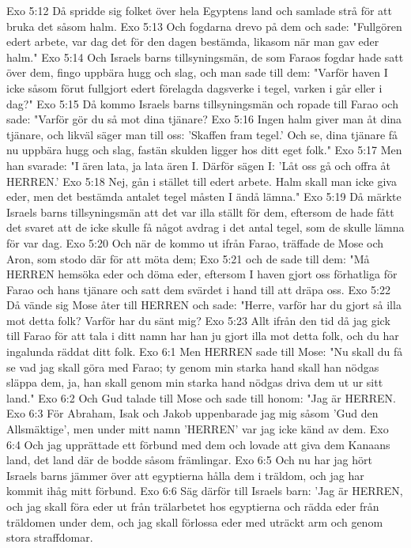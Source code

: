 Exo 5:12  Då spridde sig folket över hela Egyptens land och samlade strå för att bruka det såsom halm.
Exo 5:13  Och fogdarna drevo på dem och sade: "Fullgören edert arbete, var dag det för den dagen bestämda, likasom när man gav eder halm."
Exo 5:14  Och Israels barns tillsyningsmän, de som Faraos fogdar hade satt över dem, fingo uppbära hugg och slag, och man sade till dem: "Varför haven I icke såsom förut fullgjort edert förelagda dagsverke i tegel, varken i går eller i dag?"
Exo 5:15  Då kommo Israels barns tillsyningsmän och ropade till Farao och sade: "Varför gör du så mot dina tjänare?
Exo 5:16  Ingen halm giver man åt dina tjänare, och likväl säger man till oss: 'Skaffen fram tegel.' Och se, dina tjänare få nu uppbära hugg och slag, fastän skulden ligger hos ditt eget folk."
Exo 5:17  Men han svarade: "I ären lata, ja lata ären I. Därför sägen I: 'Låt oss gå och offra åt HERREN.'
Exo 5:18  Nej, gån i stället till edert arbete. Halm skall man icke giva eder, men det bestämda antalet tegel måsten I ändå lämna."
Exo 5:19  Då märkte Israels barns tillsyningsmän att det var illa ställt för dem, eftersom de hade fått det svaret att de icke skulle få något avdrag i det antal tegel, som de skulle lämna för var dag.
Exo 5:20  Och när de kommo ut ifrån Farao, träffade de Mose och Aron, som stodo där för att möta dem;
Exo 5:21  och de sade till dem: "Må HERREN hemsöka eder och döma eder, eftersom I haven gjort oss förhatliga för Farao och hans tjänare och satt dem svärdet i hand till att dräpa oss.
Exo 5:22  Då vände sig Mose åter till HERREN och sade: "Herre, varför har du gjort så illa mot detta folk? Varför har du sänt mig?
Exo 5:23  Allt ifrån den tid då jag gick till Farao för att tala i ditt namn har han ju gjort illa mot detta folk, och du har ingalunda räddat ditt folk.
Exo 6:1  Men HERREN sade till Mose: "Nu skall du få se vad jag skall göra med Farao; ty genom min starka hand skall han nödgas släppa dem, ja, han skall genom min starka hand nödgas driva dem ut ur sitt land."
Exo 6:2  Och Gud talade till Mose och sade till honom: "Jag är HERREN.
Exo 6:3  För Abraham, Isak och Jakob uppenbarade jag mig såsom 'Gud den Allsmäktige', men under mitt namn 'HERREN' var jag icke känd av dem.
Exo 6:4  Och jag upprättade ett förbund med dem och lovade att giva dem Kanaans land, det land där de bodde såsom främlingar.
Exo 6:5  Och nu har jag hört Israels barns jämmer över att egyptierna hålla dem i träldom, och jag har kommit ihåg mitt förbund.
Exo 6:6  Säg därför till Israels barn: 'Jag är HERREN, och jag skall föra eder ut från trälarbetet hos egyptierna och rädda eder från träldomen under dem, och jag skall förlossa eder med uträckt arm och genom stora straffdomar.
